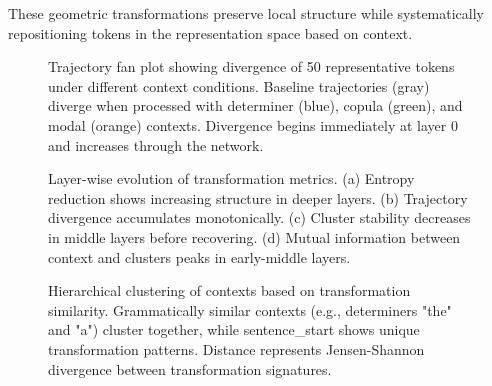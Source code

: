 These geometric transformations preserve local structure while systematically repositioning tokens in the representation space based on context.

\begin{figure}[h]
\centering
\caption{Trajectory fan plot showing divergence of 50 representative tokens under different context conditions. Baseline trajectories (gray) diverge when processed with determiner (blue), copula (green), and modal (orange) contexts. Divergence begins immediately at layer 0 and increases through the network.}
\label{fig:trajectory_fan}
\end{figure}

\begin{figure}[h]
\centering
\caption{Layer-wise evolution of transformation metrics. (a) Entropy reduction shows increasing structure in deeper layers. (b) Trajectory divergence accumulates monotonically. (c) Cluster stability decreases in middle layers before recovering. (d) Mutual information between context and clusters peaks in early-middle layers.}
\label{fig:layer_evolution}
\end{figure}

\begin{figure}[h]
\centering
\caption{Hierarchical clustering of contexts based on transformation similarity. Grammatically similar contexts (e.g., determiners "the" and "a") cluster together, while sentence\_start shows unique transformation patterns. Distance represents Jensen-Shannon divergence between transformation signatures.}
\label{fig:context_dendrogram}
\end{figure}